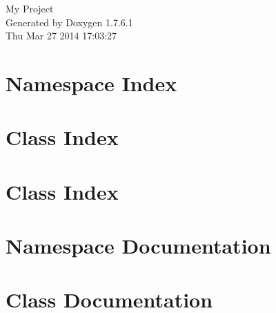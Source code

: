 \documentclass[a4paper]{book}
\begin{document}
\hypersetup{pageanchor=false,citecolor=blue}
\begin{titlepage}
\vspace*{7cm}
\begin{center}
{\Large \-My \-Project }\\
\vspace*{1cm}
{\large \-Generated by Doxygen 1.7.6.1}\\
\vspace*{0.5cm}
{\small Thu Mar 27 2014 17:03:27}\\
\end{center}
\end{titlepage}
\clearemptydoublepage
{}
\tableofcontents
\clearemptydoublepage
{}
\hypersetup{pageanchor=true,citecolor=blue}
\chapter{\-Namespace \-Index}

\chapter{\-Class \-Index}

\chapter{\-Class \-Index}

\chapter{\-Namespace \-Documentation}



\chapter{\-Class \-Documentation}





















\printindex
\end{document}
